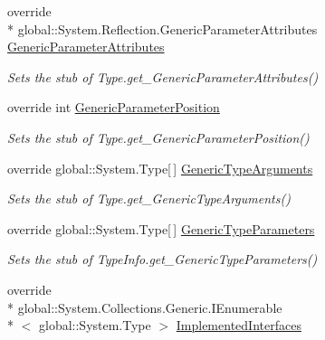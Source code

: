 \begin{DoxyCompactItemize}
override \\*
global\-::\-System.\-Reflection.\-Generic\-Parameter\-Attributes \hyperlink{class_system_1_1_reflection_1_1_fakes_1_1_stub_type_delegator_ad729bcf41c557383886505596f8e42a2}{Generic\-Parameter\-Attributes}
\begin{DoxyCompactList}\small\item\em Sets the stub of Type.\-get\-\_\-\-Generic\-Parameter\-Attributes()\end{DoxyCompactList}\item 
override int \hyperlink{class_system_1_1_reflection_1_1_fakes_1_1_stub_type_delegator_aa6dc06c74b9c68a8060758822b349e6d}{Generic\-Parameter\-Position}
\begin{DoxyCompactList}\small\item\em Sets the stub of Type.\-get\-\_\-\-Generic\-Parameter\-Position()\end{DoxyCompactList}\item 
override global\-::\-System.\-Type\mbox{[}$\,$\mbox{]} \hyperlink{class_system_1_1_reflection_1_1_fakes_1_1_stub_type_delegator_a816da5c436d01e2d28e4451a4c4b37bd}{Generic\-Type\-Arguments}
\begin{DoxyCompactList}\small\item\em Sets the stub of Type.\-get\-\_\-\-Generic\-Type\-Arguments()\end{DoxyCompactList}\item 
override global\-::\-System.\-Type\mbox{[}$\,$\mbox{]} \hyperlink{class_system_1_1_reflection_1_1_fakes_1_1_stub_type_delegator_a08d275018445d5eb52380e2d9d6560fc}{Generic\-Type\-Parameters}
\begin{DoxyCompactList}\small\item\em Sets the stub of Type\-Info.\-get\-\_\-\-Generic\-Type\-Parameters()\end{DoxyCompactList}\item 
override \\*
global\-::\-System.\-Collections.\-Generic.\-I\-Enumerable\\*
$<$ global\-::\-System.\-Type $>$ \hyperlink{class_system_1_1_reflection_1_1_fakes_1_1_stub_type_delegator_ac0dd268853b16cc9bed6ecced0a59b19}{Implemented\-Interfaces}

\end{DoxyCompactItemize}
